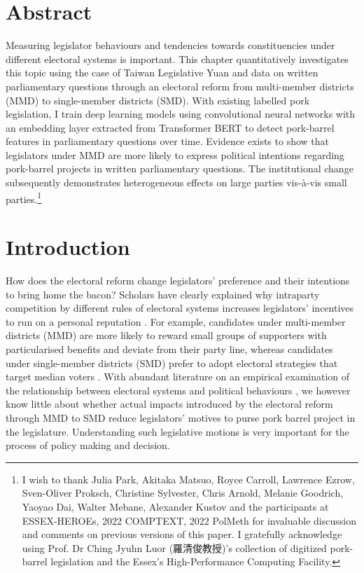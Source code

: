
\section*{\centering Abstract}
\small Measuring legislator behaviours and tendencies towards constituencies under different electoral systems is important. This chapter quantitatively investigates this topic using the case of Taiwan Legislative Yuan and data on written parliamentary questions through an electoral reform from multi-member districts (MMD) to single-member districts (SMD). With existing labelled pork legislation, I train deep learning models using convolutional neural networks with an embedding layer extracted from Transformer BERT to detect pork-barrel features in parliamentary questions over time. Evidence exists to show that legislators under MMD are more likely to express political intentions regarding pork-barrel projects in written parliamentary questions. The institutional change subsequently demonstrates heterogeneous effects on large parties vis-à-vis small parties.\footnote{I wish to thank Julia Park, Akitaka Matsuo, Royce Carroll, Lawrence Ezrow, Sven-Oliver Proksch, Christine Sylvester, Chris Arnold, Melanie Goodrich, Yaoyao Dai, Walter Mebane, Alexander Kustov and the participants at ESSEX-HEROEs, 2022 COMPTEXT, 2022 PolMeth for invaluable discussion and comments on previous versions of this paper. I gratefully acknowledge using Prof. Dr Ching Jyuhn Luor (羅清俊教授)'s collection of digitized pork-barrel legislation and the Essex's High-Performance Computing Facility.}  

\clearpage

\section*{\centering Introduction}
How does the electoral reform change legislators' preference and their intentions to bring home the bacon? Scholars have clearly explained why intraparty competition by different rules of electoral systems increases legislators' incentives to run on a personal reputation \citep{Cox1990, Downs1957, Carey1995}. For example, candidates under multi-member districts (MMD) are more likely to reward small groups of supporters with particularised benefits and deviate from their party line, whereas candidates under single-member districts (SMD) prefer to adopt electoral strategies that target median voters \citep{Cox1990}. With abundant literature on an empirical examination of the relationship between electoral systems and political behaviours \citep[e.g.][]{Cox1990, Catalinac2016, Catalinac2017, Goplerud2021}, we however know little about whether actual impacts introduced by the electoral reform through MMD to SMD reduce legislators' motives to purse pork barrel project in the legislature. Understanding such legislative motions is very important for the process of policy making and decision. 

